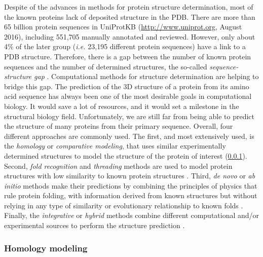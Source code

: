 \documentclass[11pt, b5paper,twoside]{tesi_upf}
\begin{document}
\par Despite of the advances in methods for protein structure determination, most of the known proteins lack of deposited structure in the PDB. There are more than 65 billion protein sequences in  UniProtKB (\url{http://www.uniprot.org}, August 2016), including 551,705 manually annotated and reviewed. However, only about 4$\%$ of the later group (\textit{i.e.} 23,195 different protein sequences) have a link to a PDB structure. Therefore, there is a gap between the number of known protein sequences and the number of determined structures, the so-called \textit{sequence-structure gap} \cite{Rost1996}. Computational methods for structure determination are helping to bridge this gap. The prediction of the 3D structure of a protein from its amino acid sequence has always been one of the most desirable goals in computational biology. It would save a lot of resources, and it would set a milestone in the structural biology field. Unfortunately, we are still far from being able to predict the structure of many proteins from their primary sequence. Overall, four different approaches are commonly used. The first, and most extensively used, is the \textit{homology} or \textit{comparative modeling}, that uses similar experimentally determined structures to model the structure of the protein of interest (\cref{Homology_modeling}). Second, \textit{fold recognition} and \textit{threading} methods are used to model protein structures with low similarity to known protein structures \cite{Jones1992, Bowie1991}. Third, \textit{de novo} or \textit{ab initio} methods make their predictions by combining the principles of physics that rule protein folding, with information derived from known structures but without relying in any type of similarity or evolutionary relationship to known folds \cite{Lee2009}. Finally, the \textit{integrative} or \textit{hybrid} methods combine different computational and/or experimental sources to perform the structure prediction \cite{Russel2012}.   
 
\subsubsection{Homology modeling} \label{Homology_modeling}
\end{document}
